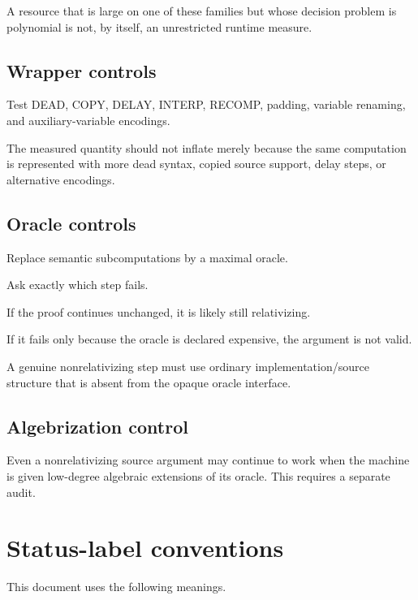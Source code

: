 \documentclass[11pt]{article}
\theoremstyle{plain}
\theoremstyle{definition}
\theoremstyle{remark}
\begin{document}
A resource that is large on one of these families but whose decision problem
is polynomial is not, by itself, an unrestricted runtime measure.

\subsection{Wrapper controls}

Test DEAD, COPY, DELAY, INTERP, RECOMP, padding, variable renaming, and
auxiliary-variable encodings.

The measured quantity should not inflate merely because the same computation
is represented with more dead syntax, copied source support, delay steps, or
alternative encodings.

\subsection{Oracle controls}

Replace semantic subcomputations by a maximal oracle.

Ask exactly which step fails.

If the proof continues unchanged, it is likely still relativizing.

If it fails only because the oracle is declared expensive, the argument is not
valid.

A genuine nonrelativizing step must use ordinary implementation/source
structure that is absent from the opaque oracle interface.

\subsection{Algebrization control}

Even a nonrelativizing source argument may continue to work when the machine is
given low-degree algebraic extensions of its oracle. This requires a separate
audit.

\section{Status-label conventions}

This document uses the following meanings.
\end{document}

